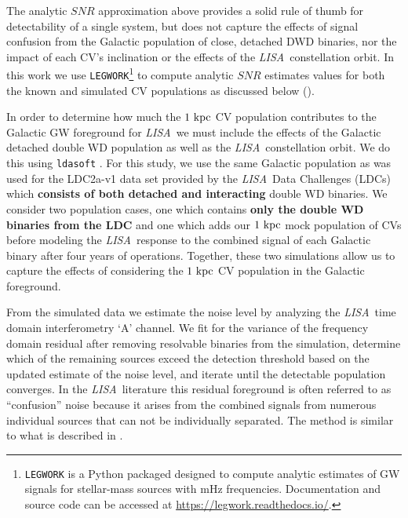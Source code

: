 \documentclass[fleqn,usenatbib]{mnras}
\newcommand{\lisa}{{\it LISA}}
\newcommand{\kb}[1]{[\textcolor{teal}{KB: #1}]}
\begin{document}
The analytic $SNR$ approximation above provides a solid rule of thumb for detectability of a single system, but does not capture the effects of signal confusion from the Galactic population of close, detached DWD binaries, nor the impact of each CV's inclination or the effects of the \lisa\ constellation orbit. In this work we use \texttt{LEGWORK}\footnote{\texttt{LEGWORK} is a Python packaged designed to compute analytic estimates of GW signals for stellar-mass sources with mHz frequencies. Documentation and source code can be accessed at \href{https://legwork.readthedocs.io/}{https://legwork.readthedocs.io/}.} to compute analytic $SNR$ estimates values for both the known and simulated CV populations as discussed below (\citealt{LEGWORK_joss,LEGWORK_apjs}). 


In order to determine how much the $1~\rm{kpc}$ CV population contributes to the Galactic GW foreground for \lisa\, we must include the effects of the Galactic detached double WD population as well as the \lisa\ constellation orbit. We do this using \texttt{ldasoft} \citep{ldasoft}. For this study, we use the same Galactic population as was used for the LDC2a-v1 data set provided by the \lisa\ Data Challenges (LDCs)~\citep{le_jeune_maude_2022_7132178} which \textbf{consists of both detached and interacting} double WD binaries. We consider two population cases, one which contains \textbf{only the double WD binaries from the LDC} and one which adds our $1~\rm{kpc}$ mock population of CVs before modeling the \lisa\ response to the combined signal of each Galactic binary after four years of operations. Together, these two simulations allow us to capture the effects of considering the $1~\rm{kpc}$ CV population in the Galactic foreground. 

From the simulated data we estimate the noise level by analyzing the \lisa\ time domain interferometry `A' channel. We fit for the variance of the frequency domain residual after removing resolvable binaries from the simulation, determine which of the remaining sources exceed the detection threshold based on the updated estimate of the noise level, and iterate until the detectable population converges. In the \lisa\ literature this residual foreground is often referred to as ``confusion'' noise because it arises from the combined signals from numerous individual sources that can not be individually separated. The method is similar to what is described in \cite{2021PhRvD.104d3019K}. 
\end{document}
